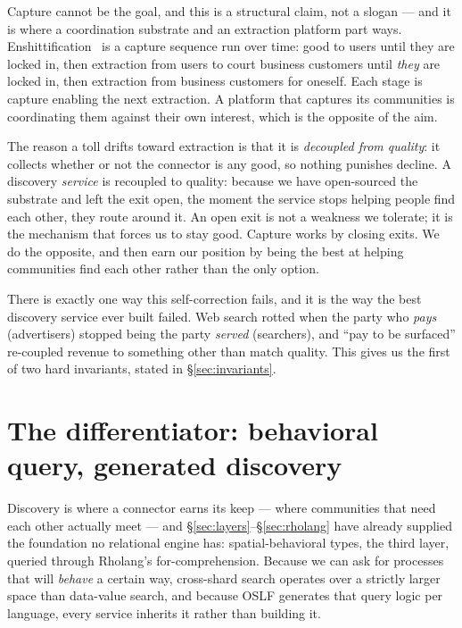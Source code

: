 \documentclass[11pt]{article}
\begin{document}
Capture cannot be the goal, and this is a structural claim, not a slogan --- and it is where a coordination substrate and an extraction platform part ways. Enshittification~\cite{doctorow} is a capture sequence run over time: good to users until they are locked in, then extraction from users to court business customers until \emph{they} are locked in, then extraction from business customers for oneself. Each stage is capture enabling the next extraction. A platform that captures its communities is coordinating them against their own interest, which is the opposite of the aim.

The reason a toll drifts toward extraction is that it is \emph{decoupled from quality}: it collects whether or not the connector is any good, so nothing punishes decline. A discovery \emph{service} is recoupled to quality: because we have open-sourced the substrate and left the exit open, the moment the service stops helping people find each other, they route around it. An open exit is not a weakness we tolerate; it is the mechanism that forces us to stay good. Capture works by closing exits. We do the opposite, and then earn our position by being the best at helping communities find each other rather than the only option.

There is exactly one way this self-correction fails, and it is the way the best discovery service ever built failed. Web search rotted when the party who \emph{pays} (advertisers) stopped being the party \emph{served} (searchers), and ``pay to be surfaced'' re-coupled revenue to something other than match quality. This gives us the first of two hard invariants, stated in \S\ref{sec:invariants}.

\section{The differentiator: behavioral query, generated discovery}\label{sec:differentiator}

Discovery is where a connector earns its keep --- where communities that need each other actually meet --- and \S\ref{sec:layers}--\S\ref{sec:rholang} have already supplied the foundation no relational engine has: spatial-behavioral types, the third layer, queried through Rholang's for-comprehension. Because we can ask for processes that will \emph{behave} a certain way, cross-shard search operates over a strictly larger space than data-value search, and because OSLF generates that query logic per language, every service inherits it rather than building it.
\end{document}
